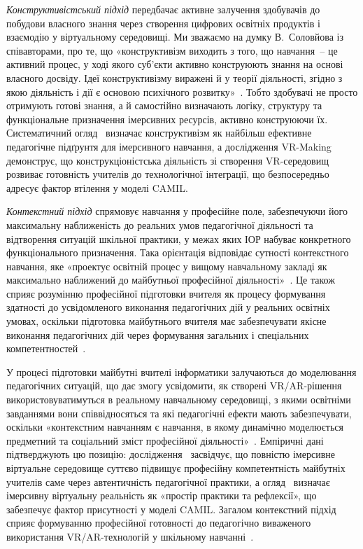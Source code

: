 \emph{Конструктивістський підхід} передбачає активне залучення здобувачів до побудови власного знання через створення цифрових освітніх продуктів і взаємодію у віртуальному середовищі. Ми зважаємо на думку В.~Соловйова із співавторами, про те, що «конструктивізм виходить з того, що навчання~-- це активний процес, у ході якого суб'єкти активно конструюють знання на основі власного досвіду. Ідеї конструктивізму виражені й у теорії діяльності, згідно з якою діяльність і дії є основою психічного розвитку»~\cite{Teplytskyi2015Modelling}. Тобто здобувачі не просто отримують готові знання, а й самостійно визначають логіку, структуру та функціональне призначення імерсивних ресурсів, активно конструюючи їх. Систематичний огляд~\cite{Mallek2024SynthesizingVR} визначає конструктивізм як найбільш ефективне педагогічне підґрунтя для імерсивного навчання, а дослідження VR-Making~\cite{Lee2022VRMaking} демонструє, що конструкціоністська діяльність зі створення VR-середовищ розвиває готовність учителів до технологічної інтеграції, що безпосередньо адресує фактор втілення у моделі CAMIL.

\emph{Контекстний підхід} спрямовує навчання у професійне поле, забезпечуючи його максимальну наближеність до реальних умов педагогічної діяльності та відтворення ситуацій шкільної практики, у межах яких ІОР набуває конкретного функціонального призначення. Така орієнтація відповідає сутності контекстного навчання, яке «проектує освітній процес у вищому навчальному закладі як максимально наближений до майбутньої професійної діяльності»~\cite{Spirin2020Ref}. Це також сприяє розумінню професійної підготовки вчителя як процесу формування здатності до усвідомленого виконання педагогічних дій у реальних освітніх умовах, оскільки підготовка майбутнього вчителя має забезпечувати якісне виконання педагогічних дій через формування загальних і спеціальних компетентностей~\cite{Dychkivska2012Innovative}.

У процесі підготовки майбутні вчителі інформатики залучаються до моделювання педагогічних ситуацій, що дає змогу усвідомити, як створені VR/AR-рішення використовуватимуться в реальному навчальному середовищі, з якими освітніми завданнями вони співвідносяться та які педагогічні ефекти мають забезпечувати, оскільки «контекстним навчанням є навчання, в якому динамічно моделюється предметний та соціальний зміст професійної діяльності»~\cite{Spirin2020Ref}. Емпіричні дані підтверджують цю позицію: дослідження~\cite{Li2024ClassMasterIVR} засвідчує, що повністю імерсивне віртуальне середовище суттєво підвищує професійну компетентність майбутніх учителів саме через автентичність педагогічної практики, а огляд~\cite{Paulsen2024CollaborativeIVR} визначає імерсивну віртуальну реальність як «простір практики та рефлексії», що забезпечує фактор присутності у моделі CAMIL. Загалом контекстний підхід сприяє формуванню професійної готовності до педагогічно виваженого використання VR/AR-технологій у шкільному навчанні~\cite{Kuzminskyi2012Pedagogy}.

